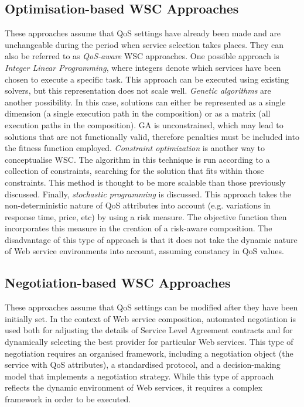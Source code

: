 \subsection{Optimisation-based WSC Approaches}
These approaches assume that QoS settings have already been made and are unchangeable during the period when service selection
takes places. They can also be referred to as \textit{QoS-aware} WSC approaches. One possible approach is \textit{Integer Linear
Programming}, where integers denote which services have been chosen to execute a specific task. This approach can be executed using
existing solvers, but this representation does not scale well. \textit{Genetic algorithms} are another possibility. In this case,
solutions can either be represented as a single dimension (a single execution path in the composition) or as a matrix (all execution
paths in the composition). GA is unconstrained, which may lead to solutions that are not functionally valid, therefore penalties
must be included into the fitness function employed. \textit{Constraint optimization} is another way to conceptualise WSC.
The algorithm in this technique is run according to a collection of constraints, searching for the solution that fits within
those constraints. This method is thought to be more scalable than those previously discussed. Finally, \textit{stochastic
programming} is discussed. This approach takes the non-deterministic nature of QoS attributes into account (e.g. variations in
response time, price, etc) by using a risk measure. The objective function then incorporates this measure in the creation of
a risk-aware composition. The disadvantage of this type of approach is that it does not take the dynamic nature of Web service
environments into account, assuming constancy in QoS values.

\subsection{Negotiation-based WSC Approaches}
These approaches assume that QoS settings can be modified after they have been initially set. In the context of Web service composition,
automated negotiation is used both for adjusting the details of Service Level Agreement contracts and for dynamically selecting the best
provider for particular Web services. This type of negotiation requires an organised framework, including a negotiation object (the service
with QoS attributes), a standardised protocol, and a decision-making model that implements a negotiation strategy. While this type of
approach reflects the dynamic environment of Web services, it requires a complex framework in order to be executed.

